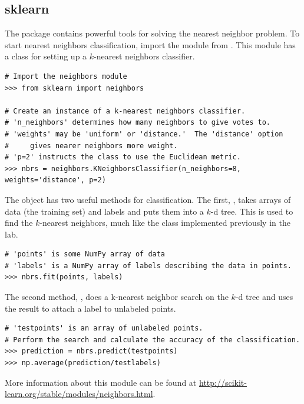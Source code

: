 \subsection*{sklearn}
The  package contains powerful tools for solving the nearest neighbor problem.
To start nearest neighbors classification, import the  module from .
This module has a class for setting up a $k$-nearest neighbors classifier.

\begin{lstlisting}
# Import the neighbors module
>>> from sklearn import neighbors

# Create an instance of a k-nearest neighbors classifier.
# 'n_neighbors' determines how many neighbors to give votes to.
# 'weights' may be 'uniform' or 'distance.'  The 'distance' option
#     gives nearer neighbors more weight.
# 'p=2' instructs the class to use the Euclidean metric.
>>> nbrs = neighbors.KNeighborsClassifier(n_neighbors=8, weights='distance', p=2)
\end{lstlisting}

The  object has two useful methods for classification.
The first, , takes arrays of data (the training set) and labels and puts them into a $k$-d tree.
This is used to find the $k$-nearest neighbors, much like the  class implemented previously in the lab.

\begin{lstlisting}
# 'points' is some NumPy array of data
# 'labels' is a NumPy array of labels describing the data in points.
>>> nbrs.fit(points, labels)
\end{lstlisting}

The second method, , does a k-nearest neighbor search on the $k$-d tree and uses the result to attach a label to unlabeled points.

\begin{lstlisting}
# 'testpoints' is an array of unlabeled points.
# Perform the search and calculate the accuracy of the classification.
>>> prediction = nbrs.predict(testpoints)
>>> np.average(prediction/testlabels)
\end{lstlisting}

More information about this module can be found at \url{http://scikit-learn.org/stable/modules/neighbors.html}.

